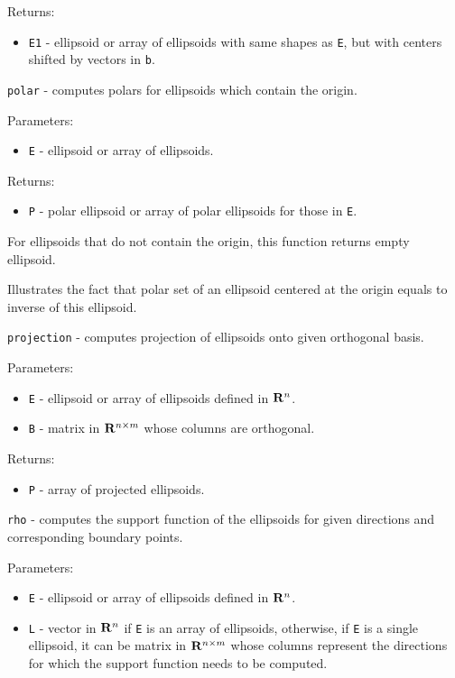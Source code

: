 \documentclass{report}
\begin{document}
Returns:
\begin{itemize}
\item {\tt E1} - ellipsoid or array of ellipsoids with same shapes as {\tt E},
but with centers shifted by vectors in {\tt b}.
\end{itemize}



\newpage

{\Large {\tt polar}} - computes polars for ellipsoids which contain the origin.

Parameters:
\begin{itemize}
\item {\tt E} - ellipsoid or array of ellipsoids.
\end{itemize}

Returns:
\begin{itemize}
\item {\tt P} - polar ellipsoid or array of polar ellipsoids for those
in {\tt E}.
\end{itemize}

For ellipsoids that do not contain the origin, this function returns empty
ellipsoid.

Illustrates the fact that polar set of an ellipsoid centered at the origin
equals to inverse of this ellipsoid.

\newpage

{\Large {\tt projection}} - computes projection of ellipsoids onto given
orthogonal basis.

Parameters:
\begin{itemize}
\item {\tt E} - ellipsoid or array of ellipsoids defined in ${\bf R}^n$.
\item {\tt B} - matrix in ${\bf R}^{n\times m}$ whose columns are orthogonal.
\end{itemize}

Returns:
\begin{itemize}
\item {\tt P} - array of projected ellipsoids.
\end{itemize}


\newpage

{\Large {\tt rho}} - computes the support function of the ellipsoids for
given directions and corresponding boundary points.

Parameters:
\begin{itemize}
\item {\tt E} - ellipsoid or array of ellipsoids defined in ${\bf R}^n$.
\item {\tt L} - vector in ${\bf R}^n$ if {\tt E} is an array of ellipsoids,
otherwise, if {\tt E} is a single ellipsoid, it can be matrix in
${\bf R}^{n\times m}$ whose columns represent the directions for which
the support function needs to be computed.
\end{itemize}
\end{document}
